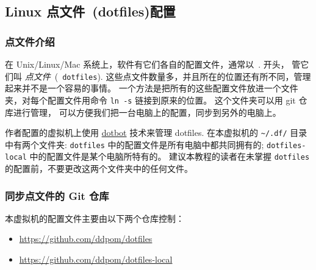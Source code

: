 \documentclass[
    11pt,
    cite=authoryear,
    device=phone,
    lang=cn,
    mode=simple,
    result=answer,
    toc=onecol,
]{elegantbook_sierxue}
\begin{document}


\subsection{Linux 点文件~(dotfiles)配置}%
\label{sub:dotfiles-settings}

\subsubsection{点文件介绍}%
\label{ssub:dotfiles-settings-intro}

在 Unix/Linux/Mac 系统上，软件有它们各自的配置文件，通常以~. 开头，
管它们叫 \emph{点文件}~(~\texttt{dotfiles}).
这些点文件数量多，并且所在的位置还有所不同，管理起来并不是一个容易的事情。
一个方法是把所有的这些配置文件放进一个文件夹，对每个配置文件用命令
\lstinline{ln -s} 链接到原来的位置。
这个文件夹可以用 git 仓库进行管理，
可以方便我们把一台电脑上的配置，同步到另外的电脑上。

作者配置的虚拟机上使用
\href{https://github.com/anishathalye/dotbot}{dotbot} 技术来管理 dotfiles.
在本虚拟机的 \lstinline{~/.df/} 目录中有两个文件夹: \lstinline{dotfiles}
中的配置文件是所有电脑中都共同拥有的; \lstinline{dotfiles-local}
中的配置文件是某个电脑所特有的。
建议本教程的读者在未掌握 \lstinline{dotfiles}
的配置前，不要更改这两个文件夹中的任何文件。


\subsubsection{同步点文件的 Git 仓库}%
\label{ssub:vbox-guest-ganx-conf}

本虚拟机的配置文件主要由以下两个仓库控制：
\begin{itemize}
    \item \href{https://github.com/ddpom/dotfiles}
        {https://github.com/ddpom/dotfiles}
    \item \href{https://github.com/ddpom/dotfiles-local}
        {https://github.com/ddpom/dotfiles-local}
\end{itemize}
\end{document}
